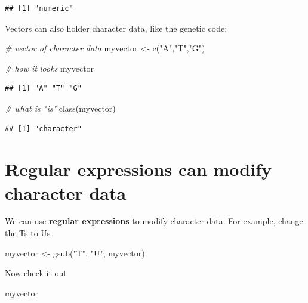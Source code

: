 \documentclass[
]{book}
\newenvironment{Shaded}{\begin{snugshade}}{\end{snugshade}}
\newcommand{\CommentTok}[1]{\textcolor[rgb]{0.56,0.35,0.01}{\textit{#1}}}
\newcommand{\FunctionTok}[1]{\textcolor[rgb]{0.00,0.00,0.00}{#1}}
\newcommand{\NormalTok}[1]{#1}
\newcommand{\OtherTok}[1]{\textcolor[rgb]{0.56,0.35,0.01}{#1}}
\newcommand{\StringTok}[1]{\textcolor[rgb]{0.31,0.60,0.02}{#1}}
\begin{document}
\begin{verbatim}
## [1] "numeric"
\end{verbatim}

Vectors can also holder character data, like the genetic code:

\begin{Shaded}
\begin{Highlighting}[]
\CommentTok{\# vector of character data}
\NormalTok{myvector }\OtherTok{\textless{}{-}} \FunctionTok{c}\NormalTok{(}\StringTok{"A"}\NormalTok{,}\StringTok{"T"}\NormalTok{,}\StringTok{"G"}\NormalTok{)}

\CommentTok{\# how it looks}
\NormalTok{myvector}
\end{Highlighting}
\end{Shaded}

\begin{verbatim}
## [1] "A" "T" "G"
\end{verbatim}

\begin{Shaded}
\begin{Highlighting}[]
\CommentTok{\# what is "is"}
\FunctionTok{class}\NormalTok{(myvector)}
\end{Highlighting}
\end{Shaded}

\begin{verbatim}
## [1] "character"
\end{verbatim}

\hypertarget{regular-expressions-can-modify-character-data}{%
\section{Regular expressions can modify character data}\label{regular-expressions-can-modify-character-data}}

We can use \textbf{regular expressions} to modify character data. For example, change the Ts to Us

\begin{Shaded}
\begin{Highlighting}[]
\NormalTok{myvector }\OtherTok{\textless{}{-}} \FunctionTok{gsub}\NormalTok{(}\StringTok{"T"}\NormalTok{, }\StringTok{"U"}\NormalTok{, myvector)}
\end{Highlighting}
\end{Shaded}

Now check it out

\begin{Shaded}
\begin{Highlighting}[]
\NormalTok{myvector}
\end{Highlighting}
\end{Shaded}
\end{document}
